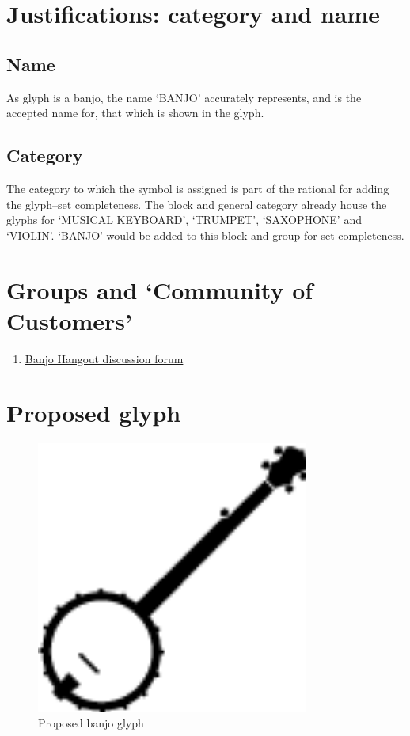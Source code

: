 \documentclass[12pt]{article}
\begin{document}
  \section{Justifications: category and name}
    \subsection{Name}
    As glyph is a banjo, the name `BANJO' accurately represents, and is 
    the accepted name for, that which is shown in the glyph.

    \subsection{Category}
    The category to which the symbol is assigned is part of the rational for
    adding the glyph--set completeness. The block and general category already
    house the glyphs for `MUSICAL KEYBOARD', `TRUMPET', `SAXOPHONE' and `VIOLIN'. 
    `BANJO' would be added to this block and group for set completeness.

  \section{Groups and `Community of Customers'}
    \begin{enumerate}
      \item \href{http://www.banjohangout.org/topic/278863}{Banjo Hangout discussion forum}
    \end{enumerate}

  \section{Proposed glyph}
    \begin{figure}[p]
      \centering
      \includegraphics[width=0.8\textwidth]{../banjo.png}
      \caption{Proposed banjo glyph}
      \label{fig:banjo_glyph}
    \end{figure}
\end{document}
